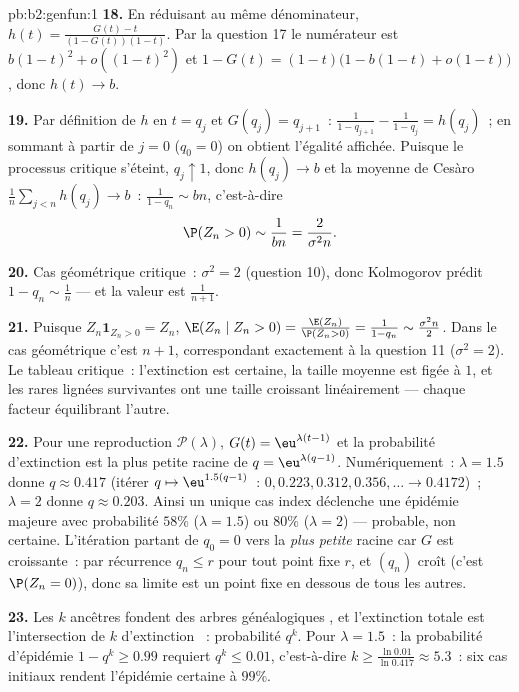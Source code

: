 \begin{solution}{pb:b2:genfun:1}
\textbf{18.} En réduisant au même dénominateur, $h(t) =
\frac{G(t) - t}{(1 - G(t))(1 - t)}$. Par la question 17 le
numérateur est $b(1-t)^2 + o((1-t)^2)$ et $1 - G(t) = (1 -
t)\bigl(1 - b(1-t) + o(1-t)\bigr)$, donc $h(t) \to b$.

\textbf{19.} Par définition de $h$ en $t = q_j$ et $G(q_j) =
q_{j+1}$~: $\frac1{1 - q_{j+1}} - \frac1{1-q_j} = h(q_j)$~;
en sommant à partir de $j = 0$ ($q_0 = 0$) on obtient l'égalité
affichée. Puisque le processus critique s'éteint, $q_j \uparrow 1$,
donc $h(q_j) \to b$ et la moyenne de Cesàro $\frac1n\sum_{j<n}h(q_j)
\to b$~: $\frac1{1-q_n} \sim bn$, c'est-à-dire
\[
\P(Z_n > 0) \sim \frac1{bn} = \frac{2}{\sigma^2 n} .
\]

\textbf{20.} Cas géométrique critique~: $\sigma^2 = 2$
(question 10), donc Kolmogorov prédit $1 - q_n \sim \frac1n$
--- et la valeur  est $\frac1{n+1}$.

\textbf{21.} Puisque $Z_n\mathbf 1_{Z_n > 0} = Z_n$, $\E(Z_n
\mid Z_n > 0) = \frac{\E(Z_n)}{\P(Z_n > 0)} = \frac1{1 -
q_n} \sim \frac{\sigma^2n}2$. Dans le cas géométrique c'est
$n + 1$, correspondant exactement à la question 11 ($\sigma^2 = 2$). Le
tableau critique~: l'extinction est certaine, la taille moyenne est
figée à $1$, et les rares lignées survivantes ont une taille croissant
linéairement --- chaque facteur équilibrant l'autre.

\textbf{22.} Pour une reproduction $\mathcal P(\lambda)$, $G(t) =
\eu^{\lambda(t-1)}$ et la probabilité d'extinction est la
plus petite racine de $q = \eu^{\lambda(q-1)}$. Numériquement~:
$\lambda = 1.5$ donne $q \approx 0.417$ (itérer $q \mapsto
\eu^{1.5(q-1)}$~: $0, 0.223, 0.312, 0.356, \dots \to 0.4172$)~;
$\lambda = 2$ donne $q \approx 0.203$. Ainsi un unique cas
index déclenche une épidémie majeure avec probabilité $58\%$
($\lambda = 1.5$) ou $80\%$ ($\lambda = 2$) --- probable, non
certaine. L'itération partant de $q_0 = 0$  vers la
\emph{plus petite} racine car $G$ est croissante~: par
récurrence $q_n \leq r$ pour tout point fixe $r$, et $(q_n)$
croît (c'est $\P(Z_n = 0)$), donc sa limite est un point fixe
en dessous de tous les autres.

\textbf{23.} Les $k$ ancêtres fondent des arbres généalogiques
, et l'extinction totale est l'intersection de $k$
 d'extinction ~: probabilité $q^k$. Pour
$\lambda = 1.5$~: la probabilité d'épidémie $1 - q^k \geq 0.99$
requiert $q^k \leq 0.01$, c'est-à-dire $k \geq
\frac{\ln 0.01}{\ln 0.417} \approx 5.3$~: six cas initiaux
rendent l'épidémie certaine à $99\%$.


\end{solution}
